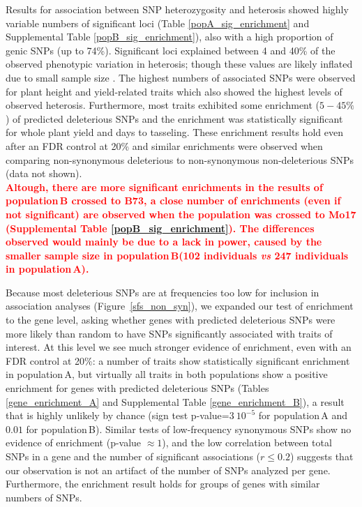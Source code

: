\documentclass[12pt]{article}
\newcommand{\sme}[1]{\textcolor{red}{\bf #1}}
\begin{document}
Results for association between SNP heterozygosity and heterosis showed highly variable numbers of significant loci (Table \ref{popA_sig_enrichment} and Supplemental Table \ref{popB_sig_enrichment}), also with a high proportion of genic SNPs (up to 74\%). Significant loci explained between 4 and 40\% of the observed phenotypic variation in heterosis; though these values are likely inflated due to small sample size \citep{Beavis1994}. The highest numbers of associated SNPs were observed for plant height and yield-related traits which also showed the highest levels of observed heterosis. 
Furthermore, most traits exhibited some enrichment ($5-45\%$) of predicted deleterious SNPs and the enrichment was statistically significant for whole plant yield and days to tasseling. These enrichment results hold even after an FDR control at 20\% and similar enrichments were observed when comparing non-synonymous deleterious to non-synonymous non-deleterious SNPs (data not shown).\\
%
\sme{Altough, there are more significant enrichments in the results of population\,B crossed to B73, a close number of enrichments (even if not significant) are observed when the population was crossed to Mo17 (Supplemental Table \ref{popB_sig_enrichment}). The differences observed would mainly be due to a lack in power, caused by the smaller sample size in population\,B(102 individuals \emph{vs} 247 individuals in population\,A).}

Because most deleterious SNPs are at frequencies too low for inclusion in association analyses (Figure~\ref{sfs_non_syn}), we expanded our test of enrichment to the gene level, asking whether genes with predicted deleterious SNPs were more likely than random to have SNPs significantly associated with traits of interest. At this level we see much stronger evidence of enrichment, even with an FDR control at 20\%: a number of traits show statistically significant enrichment in population\,A, but virtually all traits in both populations show a positive enrichment for genes with predicted deleterious SNPs (Tables \ref{gene_enrichment_A} and Supplemental Table \ref{gene_enrichment_B}), a result that is highly unlikely by chance (sign test p-value=$3\ 10^{-5}$ for population\,A and $0.01$ for population\,B). Similar tests of low-frequency synonymous SNPs show no evidence of enrichment (p-value $\approx 1$), and the low correlation between total SNPs in a gene and the number of significant associations ($r\leq 0.2$) suggests that our observation is not an artifact of the number of SNPs analyzed per gene. Furthermore, the enrichment result holds for groups of genes with similar numbers of SNPs.
\end{document}

